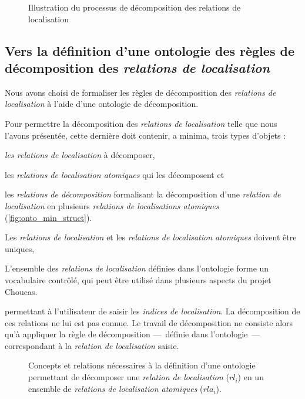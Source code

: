 \begin{figure}
  \centering
  \missingfigure{}
  \caption{Illustration du processus de décomposition des relations de
  localisation}
  \label{fig:logique_dec}
\end{figure}

\subsection{Vers la définition d'une ontologie des règles de
  décomposition des \emph{relations de localisation}}

Nous avons choisi de formaliser les règles de décomposition des
\emph{relations de localisation} à l'aide d'une ontologie de
décomposition.

Pour permettre la décomposition des \emph{relations de localisation}
telle que nous l'avons présentée, cette dernière doit contenir, a
minima, trois types d'objets :
%
\begin{enumerate*}[label=(\alph*)]
\item \emph{les relations de localisation} à décomposer,
\item les \emph{relations de localisation atomiques} qui les
  décomposent et
\item les \emph{relations de décomposition} formalisant la
  décomposition d'une \emph{relation de localisation} en plusieurs
  \emph{relations de localisations atomiques}
  (\autoref{fig:onto_min_struct}).
\end{enumerate*}
%
Les \emph{relations de localisation} et les \emph{relations de
  localisation atomiques} doivent être uniques, 

L'ensemble des \emph{relations de localisation} définies dans
l'ontologie forme un vocabulaire contrôlé, qui peut être utilisé dans
plusieurs aspects du projet Choucas. 



permettant à l'utilisateur
de saisir les \emph{indices de localisation}. La décomposition de ces
relations ne lui est pas connue. Le travail de décomposition ne
consiste alors qu'à appliquer la règle de décomposition ---~définie
dans l'ontologie~--- correspondant à la \emph{relation de
  localisation} saisie.

\begin{figure}
  \centering
   
  \caption[Structure générale d'une ontologie de
  décomposition]{Concepts et relations nécessaires à la définition
    d'une ontologie permettant de décomposer une \emph{relation de
      localisation} ($rl_i$) en un ensemble de \emph{relations de
      localisation atomiques} ($rla_i$).}
  \label{fig:onto_min_struct}
\end{figure}



